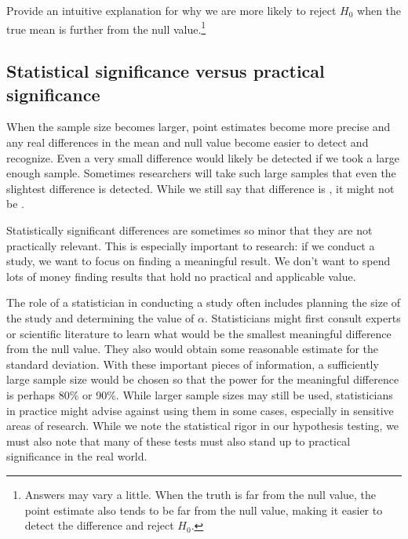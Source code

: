 \begin{exercise}
Provide an intuitive explanation for why we are more likely to reject $H_0$ when the true mean is further from the null value.\footnote{Answers may vary a little. When the truth is far from the null value, the point estimate also tends to be far from the null value, making it easier to detect the difference and reject $H_0$.}
\end{exercise}

\subsection{Statistical significance versus practical significance}

When the sample size becomes larger, point estimates become more precise and any real differences in the mean and null value become easier to detect and recognize. Even a very small difference would likely be detected if we took a large enough sample. Sometimes researchers will take such large samples that even the slightest difference is detected. While we still say that difference is , it might not be .

Statistically significant differences are sometimes so minor that they are not practically relevant. This is especially important to research: if we conduct a study, we want to focus on finding a meaningful result. We don't want to spend lots of money finding results that hold no practical and applicable value.

The role of a statistician in conducting a study often includes planning the size of the study and determining the value of $\alpha$. Statisticians might first consult experts or scientific literature to learn what would be the smallest meaningful difference from the null value. They also would obtain some reasonable estimate for the standard deviation. With these important pieces of information, a sufficiently large sample size would be chosen so that the power for the meaningful difference is perhaps 80\% or 90\%. While larger sample sizes may still be used, statisticians in practice might advise against using them in some cases, especially in sensitive areas of research. While we note the statistical rigor in our hypothesis testing, we must also note that many of these tests must also stand up to practical significance in the real world.










